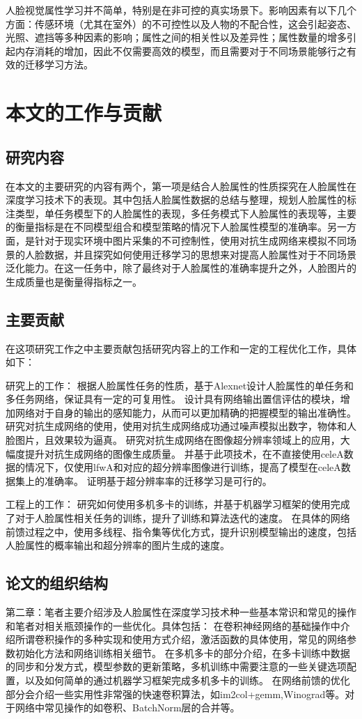 人脸视觉属性学习并不简单，特别是在非可控的真实场景下。影响因素有以下几个方面：传感环境（尤其在室外）的不可控性以及人物的不配合性，这会引起姿态、光照、遮挡等多种因素的影响；属性之间的相关性以及差异性；属性数量的增多引起内存消耗的增加，因此不仅需要高效的模型，而且需要对于不同场景能够行之有效的迁移学习方法。
\section{本文的工作与贡献}
\subsection{研究内容}
在本文的主要研究的内容有两个，第一项是结合人脸属性的性质探究在人脸属性在深度学习技术下的表现。其中包括人脸属性数据的总结与整理，规划人脸属性的标注类型，单任务模型下的人脸属性的表现，多任务模式下人脸属性的表现等，主要的衡量指标是在不同模型组合和模型策略的情况下人脸属性模型的准确率。另一方面，是针对于现实环境中图片采集的不可控制性，使用对抗生成网络来模拟不同场景的人脸数据，并且探究如何使用迁移学习的思想来对提高人脸属性对于不同场景泛化能力。在这一任务中，除了最终对于人脸属性的准确率提升之外，人脸图片的生成质量也是衡量得指标之一。
\subsection{主要贡献}
在这项研究工作之中主要贡献包括研究内容上的工作和一定的工程优化工作，具体如下：

研究上的工作：
根据人脸属性任务的性质，基于Alexnet\cite{ALEXNET}设计人脸属性的单任务和多任务网络，保证具有一定的可复用性。
设计具有网络输出置信评估的模块，增加网络对于自身的输出的感知能力，从而可以更加精确的把握模型的输出准确性。
研究对抗生成网络的使用，使用对抗生成网络成功通过噪声模拟出数字，物体和人脸图片，且效果较为逼真。
研究对抗生成网络在图像超分辨率领域上的应用，大幅度提升对抗生成网络的图像生成质量。
并基于此项技术，在不直接使用celeA数据的情况下，仅使用lfwA和对应的超分辨率图像进行训练，提高了模型在celeA数据集上的准确率。
证明基于超分辨率率的迁移学习是可行的。

工程上的工作：
研究如何使用多机多卡的训练，并基于机器学习框架的使用完成了对于人脸属性相关任务的训练，提升了训练和算法迭代的速度。
在具体的网络前馈过程之中，使用多线程、指令集等优化方式，提升识别模型输出的速度，包括人脸属性的概率输出和超分辨率的图片生成的速度。
\subsection{论文的组织结构}
第二章：笔者主要介绍涉及人脸属性在深度学习技术种一些基本常识和常见的操作和笔者对相关瓶颈操作的一些优化。具体包括：
在卷积神经网络的基础操作中介绍所谓卷积操作的多种实现和使用方式介绍，激活函数的具体使用，常见的网络参数初始化方法和网络训练相关细节。
在多机多卡的部分介绍，在多卡训练中数据的同步和分发方式，模型参数的更新策略，多机训练中需要注意的一些关键选项配置，以及如何简单的通过机器学习框架完成多机多卡的训练。
在网络前馈的优化部分会介绍一些实用性非常强的快速卷积算法，如im2col+gemm,Winograd等。对于网络中常见操作的如卷积、BatchNorm层的合并等。

